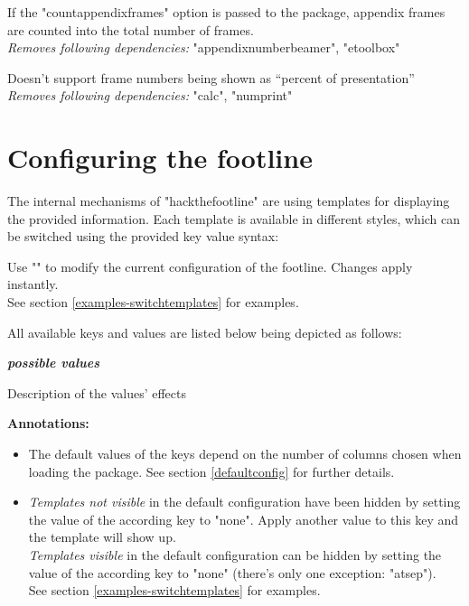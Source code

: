 \documentclass[11pt]{ltxdoc}
\newcommand{\DescribeOption}[3]{
  \DescribeMacro{#1}
  \begin{minipage}[t]{\textwidth}
    \textit{\textbf{#2}}\dotfill~\par
    \begingroup
    \vspace{0.5em}#3\par
    \endgroup
  \end{minipage}%
  \bigskip\medskip%
}
\begin{document}
	\medskip
	If the "countappendixframes" option is passed to the package, appendix frames are counted into the total number of frames. \\
	\textit{Removes following dependencies:} "appendixnumberbeamer", "etoolbox"
	
	\medskip
	Doesn't support frame numbers being shown as \enquote{percent of presentation} \\
	\textit{Removes following dependencies:} "calc", "numprint"



	\section{Configuring the footline}
	The internal mechanisms of "hackthefootline" are using templates for displaying the provided information.
	Each template is available in different styles, which can be switched using the provided key value syntax:
	
	\medskip
	\DescribeMacro{\htfconfig}
	Use "" to modify the current configuration of the footline. Changes apply instantly. \\
	See section \ref{examples-switchtemplates} for examples.
	
	\bigskip
	All available keys and values are listed below being depicted as follows:
	
	\medskip
	\DescribeOption{key}{possible values}{Description of the values' effects}
	
	\medskip
	\textbf{Annotations:}
	\begin{itemize}
		\item
			The default values of the keys depend on the number of columns chosen when loading the package. See section \ref{defaultconfig} for further details.
		\item
			\textit{Templates not visible} in the default configuration have been hidden by setting the value of the according key to "none". Apply another value to this key and the template will show up. \\
			\textit{Templates visible} in the default configuration can be hidden by setting the value of the according key to "none" (there's only one exception: "atsep"). \\
			See section \ref{examples-switchtemplates} for examples.
	\end{itemize}
	
\end{document}
